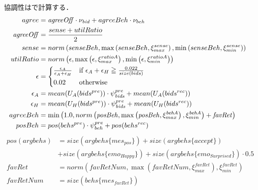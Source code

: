 協調性はで計算する．
\begin{align}
    agree &= \mathit{agreeOff} \cdot \nu_{\mathit{bid}} + agreeBeh \cdot \nu_{beh} \label{eq:agreeableness} \\
    \mathit{agreeOff} &= \frac{sense + utilRatio}{2} \nonumber \\
    sense &= norm \left(senseBeh, \max \left(senseBeh, \xi_{max}^{sense}\right), \min \left(senseBeh, \xi_{min}^{sense}\right) \right) \nonumber \\
    utilRatio &= norm \left(\epsilon, \max \left(\epsilon, \xi_{max}^{ratioA}\right), \min \left(\epsilon, \xi_{min}^{ratioA}\right) \right) \nonumber \\
    \epsilon &= 
    \begin{cases*}
        \frac{\epsilon_A}{\epsilon_A + \epsilon_H} & if $\epsilon_A + \epsilon_H \geqq \frac{0.022}{size(bids)}$  \\
        0.02 & otherwise 
    \end{cases*} \nonumber \\
    \epsilon_A &= mean(U_A(bids^{pre})) \cdot \psi_{\mathit{bids}}^{pre} + mean(U_A(bids^{rec})) \nonumber \\
    \epsilon_H &= mean(U_H(bids^{pre})) \cdot \psi_{\mathit{bids}}^{pre} + mean(U_H(bids^{rec})) \nonumber \\
    agreeBeh &= \min \left( 1.0, norm\left( \mathit{posBeh}, \max \left( \mathit{posBeh}, \xi_{max}^{\mathit{behA}}\right), \xi_{min}^{\mathit{behA}} \right) + \mathit{favRet}\right) \nonumber \\
    posBeh &=  pos(behs^{pre}) \cdot \psi_{beh}^{pre} + pos(behs^{rec}) \nonumber 
\end{align}
\begin{align}
    pos(argbehs) &= size(argbehs\{mes_{pos}\}) + size(argbehs\{accept\}) \nonumber \\
    &+ size(argbehs\{emo_{Happy}\}) \nonumber + size(argbehs\{emo_{Surprised}\}) \cdot 0.5 \nonumber \\
    \mathit{favRet} &= norm\left( \mathit{favRetNum}, \max \left( \mathit{favRetNum}, \xi_{max}^{\mathit{favRet}}\right), \xi_{min}^{\mathit{favRet}} \right) \nonumber \\
    \mathit{favRetNum} &= size(behs\{mes_{\mathit{favRet}}\}) \nonumber
\end{align}

